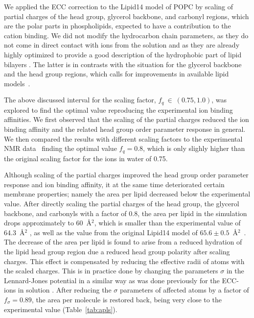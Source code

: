 \documentclass[aip,jcp,twocolumn]{revtex4}
\begin{document}
We applied the ECC correction to the Lipid14 model of POPC by scaling of partial charges of the head group,
glycerol backbone, and carbonyl regions, which are the polar parts in phospholipids,
expected to have a contribution to the cation binding.
We did not modify the hydrocarbon chain parameters, 
as they do not come in direct contact with ions from the solution 
and as they are already highly optimized to provide a good description of the
hydrophobic part of lipid bilayers \cite{dickson14,ollila16}.
The latter is in contrasts with the situation for the glycerol backbone and the head group regions, 
which calls for improvements in available lipid models~\cite{botan15}.

The above discussed interval for the scaling factor, $f_q~\in~(0.75, 1.0)$,
was explored to find the optimal value reproducing the experimental ion binding affinities.
We first observed that the scaling
of the partial charges reduced the ion binding affinity and the 
related head group order parameter response in general.
We then compared the results with different scaling factors to the experimental 
NMR data~\cite{akutsu81,altenbach84,scherer89} finding the optimal 
value $f_q = 0.8$,
which is only slighly higher than the original scaling factor for the ions in water of 0.75.

Although scaling of the partial charges improved 
the head group order parameter response and ion binding affinity,
it at the same time deteriorated certain membrane properties; 
namely the area per lipid decreased below the experimental value. 
After directly scaling the partial charges of the head group, the glycerol
backbone, and carbonyls with a factor of 0.8, 
the area per lipid in the simulation drops approximately to 60~\AA$^2$,
which is smaller than the experimental value of 64.3~\AA$^2$ \cite{kucerka11}, 
as well as the value from the original Lipid14 model of $65.6 \pm 0.5$~\AA$^2$~\cite{dickson14}.
The decrease of the area per lipid is found to arise from a reduced hydration of the lipid head group region
due a reduced head group polarity after scaling charges. 
This effect is compensated
by reducing the effective radii of atoms with the scaled charges.
This is in practice done by changing the parameters $\sigma$ in the Lennard-Jones potential 
in a similar way as was done previously for the ECC-ions in solution \cite{kohagen14,kohagen16,Pluharova2014}.
After reducing the $\sigma$ parameters of affected atoms by a factor of $f_\sigma = 0.89$, 
the area per molecule is restored
back, being very close to the experimental value (Table~\ref{tab:apls}). 
\end{document}
